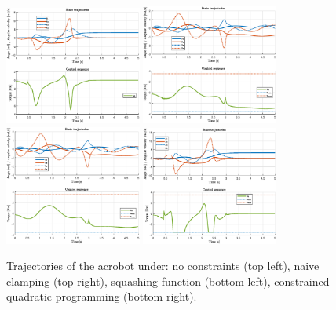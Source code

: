 \begin{figure}[H]
    \centering
    \includegraphics[width=0.4\textwidth]{assets/acrobot_traj.eps}
    \includegraphics[width=0.4\textwidth]{assets/acrobot_nc_traj.eps} \\
    \includegraphics[width=0.4\textwidth]{assets/acrobot_sf_traj.eps}
    \includegraphics[width=0.4\textwidth]{assets/acrobot_qp_traj.eps}
    \caption{Trajectories of the acrobot under: no constraints (top left), naive clamping (top right), squashing function (bottom left), constrained quadratic programming (bottom right).}
    \label{fig:acrobot_traj}
\end{figure}

